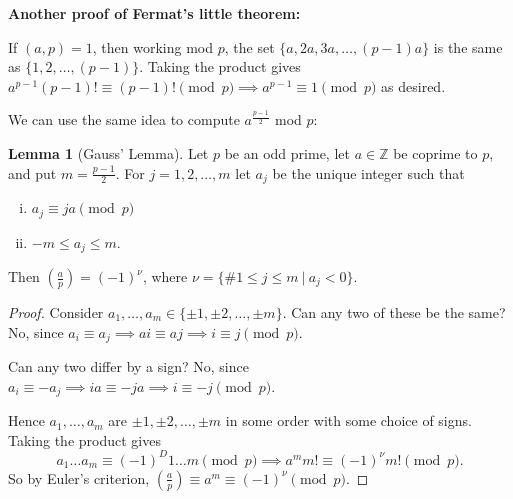 \documentclass{article}
\theoremstyle{definition}
\newtheorem{lemma}[theorem]{Lemma}
\begin{document}

\textbf{Another proof of Fermat's little theorem:}

If $(a,p)=1$, then working mod $p$, the set $\{a,2a,3a,\ldots,(p-1)a\}$ is the same as $\{1,2,\ldots,(p-1)\}$. Taking the product gives $a^{p-1}(p-1)! \equiv (p-1)! \pmod{p} \implies a^{p-1}\equiv 1\pmod{p}$ as desired.
\vspace{1mm}

We can use the same idea to compute $a^{\frac{p-1}{2}}$ mod $p$:

\begin{lemma}[Gauss' Lemma]
    Let $p$ be an odd prime, let $a \in\mathbb{Z}$ be coprime to $p$, and put $m=\frac{p-1}{2}$. For $j=1,2,\ldots,m$ let $a_j$ be the unique integer such that
    \begin{enumerate}[(i)]
        \item $a_j \equiv ja \pmod{p}$
        \item $-m\le a_j \le m$.
    \end{enumerate}
    Then $\left(\frac{a}{p}\right) = (-1)^\nu$, where $\nu = \{\# 1\le j \le m ~|~ a_j < 0\}$.
\end{lemma}
\begin{proof}
    Consider $a_1,\ldots,a_m \in \{\pm1,\pm2,\ldots,\pm m\}$. Can any two of these be the same? No, since $a_i \equiv a_j \implies ai\equiv aj \implies i \equiv j \pmod{p}$. 

    Can any two differ by a sign? No, since $a_i \equiv -a_j \implies ia \equiv -ja \implies i \equiv -j \pmod{p}$.

    Hence $a_1,\ldots,a_m$ are $\pm1,\pm2, \ldots, \pm m$ in some order with some choice of signs. Taking the product gives $$a_1\ldots a_m \equiv (-1)^D 1\ldots m \pmod{p} \implies a^m m! \equiv (-1)^\nu m! \pmod{p}.$$
    So by Euler's criterion, $\left(\frac{a}{p}\right) \equiv  a^m \equiv (-1)^\nu \pmod{p}$.
\end{proof}
\end{document}
